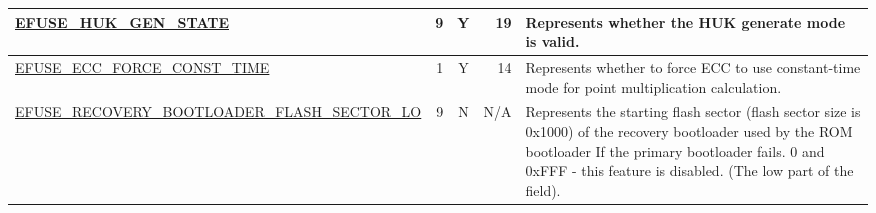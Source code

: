 \begin{longtable}[l]{ |m{8.2cm}|r|c|r|m{9cm}| }
    \hyperref[fielddesc:EFUSEHUKGENSTATE]{EFUSE\_HUK\_GEN\_STATE} & 9 & Y & 19 & Represents whether the HUK generate mode is valid. \\ \hline
    \hyperref[fielddesc:EFUSEECCFORCECONSTTIME]{EFUSE\_ECC\_FORCE\_CONST\_TIME} & 1 & Y & 14 & Represents whether to force ECC to use constant-time mode for point multiplication calculation.  \\ \hline
    \hyperref[fielddesc:EFUSERECOVERYBOOTLOADERFLASHSECTORLO]{EFUSE\_RECOVERY\_BOOTLOADER\_FLASH\_SECTOR\_LO} & 9 & N & N/A & Represents the starting flash sector (flash sector size is 0x1000) of the recovery bootloader used by the ROM bootloader If the primary bootloader fails. 0 and 0xFFF - this feature is disabled. (The low part of the field). \\ \hline
\end{longtable}
